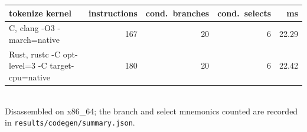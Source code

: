 \begin{tabular}{lrrrr}
\toprule
tokenize kernel & instructions & cond.\ branches & cond.\ selects & ms \\
\midrule
C, clang -O3 -march=native & 167 & 20 & 6 & 22.29 \\
Rust, rustc -C opt-level=3 -C target-cpu=native & 180 & 20 & 6 & 22.42 \\
\bottomrule
\end{tabular}
\\[2pt]{\footnotesize Disassembled on x86\_64; the branch and select mnemonics counted are recorded in \texttt{results/codegen/summary.json}.}
